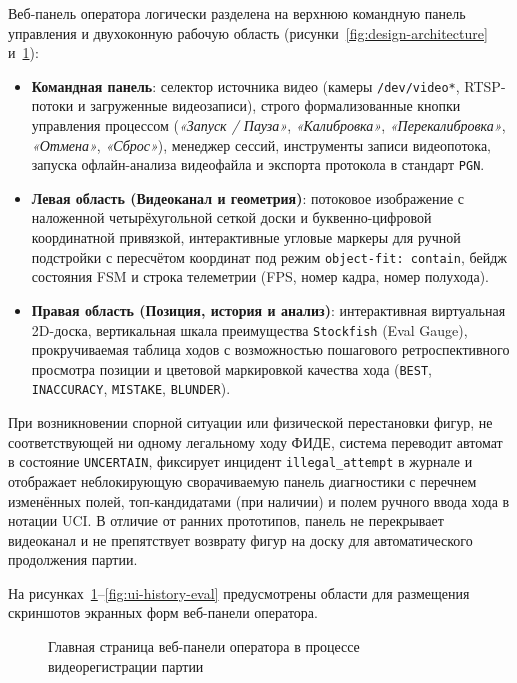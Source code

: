 Веб-панель оператора логически разделена на верхнюю командную панель управления и двухоконную рабочую область (рисунки~\ref{fig:design-architecture} и~\ref{fig:ui-web-main}):
\begin{itemize}
    \item \textbf{Командная панель}: селектор источника видео (камеры \texttt{/dev/video*}, RTSP-потоки и загруженные видеозаписи), строго формализованные кнопки управления процессом (\textit{«Запуск / Пауза»}, \textit{«Калибровка»}, \textit{«Перекалибровка»}, \textit{«Отмена»}, \textit{«Сброс»}), менеджер сессий, инструменты записи видеопотока, запуска офлайн-анализа видеофайла и экспорта протокола в стандарт \texttt{PGN}.
    \item \textbf{Левая область (Видеоканал и геометрия)}: потоковое изображение с наложенной четырёхугольной сеткой доски и буквенно-цифровой координатной привязкой, интерактивные угловые маркеры для ручной подстройки с пересчётом координат под режим \texttt{object-fit: contain}, бейдж состояния FSM и строка телеметрии (FPS, номер кадра, номер полухода).
    \item \textbf{Правая область (Позиция, история и анализ)}: интерактивная виртуальная 2D-доска, вертикальная шкала преимущества \texttt{Stockfish} (Eval Gauge), прокручиваемая таблица ходов с возможностью пошагового ретроспективного просмотра позиции и цветовой маркировкой качества хода (\texttt{BEST}, \texttt{INACCURACY}, \texttt{MISTAKE}, \texttt{BLUNDER}).
\end{itemize}

При возникновении спорной ситуации или физической перестановки фигур, не соответствующей ни одному легальному ходу ФИДЕ, система переводит автомат в состояние \texttt{UNCERTAIN}, фиксирует инцидент \texttt{illegal\_attempt} в журнале и отображает неблокирующую сворачиваемую панель диагностики с перечнем изменённых полей, топ-кандидатами (при наличии) и полем ручного ввода хода в нотации UCI. В отличие от ранних прототипов, панель не перекрывает видеоканал и не препятствует возврату фигур на доску для автоматического продолжения партии.

На рисунках~\ref{fig:ui-web-main}--\ref{fig:ui-history-eval} предусмотрены области для размещения скриншотов экранных форм веб-панели оператора.

\begin{figure}[htbp]
\centering
{}
\caption{Главная страница веб-панели оператора в процессе видеорегистрации партии}
\label{fig:ui-web-main}
\end{figure}

